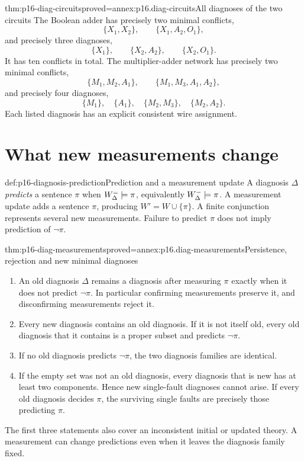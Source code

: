 \begin{hbtheorem}{thm:p16-diag-circuits}{proved=annex:p16.diag-circuits}{All diagnoses of the two circuits}
The Boolean adder has precisely two minimal conflicts,
\[
             \{X_1,X_2\},\qquad \{X_1,A_2,O_1\},
\]
and precisely three diagnoses,
\[
                 \{X_1\},\qquad\{X_2,A_2\},\qquad\{X_2,O_1\}.
\]
It has ten conflicts in total.
The multiplier-adder network has precisely two minimal conflicts,
\[
           \{M_1,M_2,A_1\},\qquad\{M_1,M_3,A_1,A_2\},
\]
and precisely four diagnoses,
\[
                 \{M_1\},\quad\{A_1\},\quad
                 \{M_2,M_3\},\quad\{M_2,A_2\}.
\]
Each listed diagnosis has an explicit consistent wire assignment.
\end{hbtheorem}

\section{What new measurements change}
\label{sec:p16-diagnosis-measurements}

\begin{hbdefinition}{def:p16-diagnosis-prediction}{Prediction and a measurement update}
A diagnosis \(\Delta\) \emph{predicts} a sentence \(\pi\)
when \(W^=_\Delta\models\pi\), equivalently
\(W^-_\Delta\models\pi\). A measurement update adds a
sentence \(\pi\), producing \(W'=W\cup\{\pi\}\).
A finite conjunction represents several new measurements.
Failure to predict \(\pi\) does not imply prediction of
\(\neg\pi\).
\end{hbdefinition}

\begin{hbtheorem}{thm:p16-diag-measurements}{proved=annex:p16.diag-measurements}{Persistence, rejection and new minimal diagnoses}
\begin{enumerate}
\item An old diagnosis \(\Delta\) remains a diagnosis after
      measuring \(\pi\) exactly when it does not predict
      \(\neg\pi\). In particular confirming measurements
      preserve it, and disconfirming measurements reject it.
\item Every new diagnosis contains an old diagnosis.
      If it is not itself old, every old diagnosis that
      it contains is a proper subset and predicts
      \(\neg\pi\).
\item If no old diagnosis predicts \(\neg\pi\), the two
      diagnosis families are identical.
\item If the empty set was not an old diagnosis, every
      diagnosis that is new has at least two components.
      Hence new single-fault diagnoses cannot arise.
      If every old diagnosis decides \(\pi\), the surviving
      single faults are precisely those predicting \(\pi\).
\end{enumerate}
The first three statements also cover an inconsistent initial
or updated theory. A measurement can change predictions even
when it leaves the diagnosis family fixed.
\end{hbtheorem}

